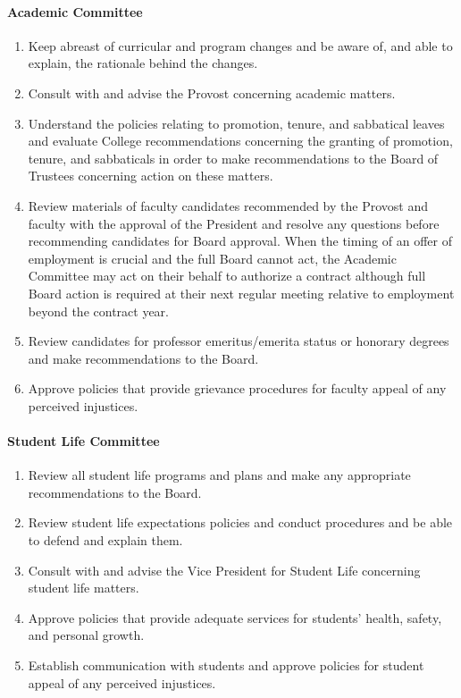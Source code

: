 			\paragraph{Academic Committee}
				\begin{enumerate}
					\item{Keep abreast of curricular and program changes and be aware of, and able to explain, the rationale behind the changes.}
					\item{Consult with and advise the Provost concerning academic matters.}
					\item{Understand the policies relating to promotion, tenure, and sabbatical leaves and evaluate College recommendations concerning the granting of promotion, tenure, and sabbaticals in order to make recommendations to the Board of Trustees concerning action on these matters.}
					\item{Review materials of faculty candidates recommended by the Provost and faculty with the approval of the President and resolve any questions before recommending candidates for Board approval.  When the timing of an offer of employment is crucial and the full Board cannot act, the Academic Committee may act on their behalf to authorize a contract although full Board action is required at their next regular meeting relative to employment beyond the contract year.}
					\item{Review candidates for professor emeritus/emerita status or honorary degrees and make recommendations to the Board.}
					\item{Approve policies that provide grievance procedures for faculty appeal of any perceived injustices.}
				\end{enumerate}
			\paragraph{Student Life Committee}
				\begin{enumerate}
					\item{Review all student life programs and plans and make any appropriate recommendations to the Board.}
					\item{Review student life expectations policies and conduct procedures and be able to defend and explain them.}
					\item{Consult with and advise the Vice President for Student Life concerning student life matters.}
					\item{Approve policies that provide adequate services for students' health, safety, and personal growth.}
					\item{Establish communication with students and approve policies for student appeal of any perceived injustices.}
				\end{enumerate}
